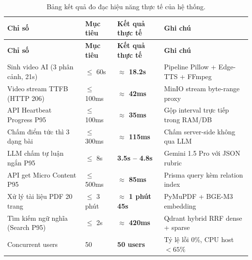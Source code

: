 \begin{longtable}{|p{4.5cm}|p{2.5cm}|p{3.2cm}|p{4.3cm}|}
    \caption{Bảng kết quả đo đạc hiệu năng thực tế của hệ thống.} \label{tab:performance-lvtn} \\
    \hline
    \textbf{Chỉ số} & \textbf{Mục tiêu} & \textbf{Kết quả thực tế} & \textbf{Ghi chú} \\
    \hline
    \endfirsthead
    \hline
    \textbf{Chỉ số} & \textbf{Mục tiêu} & \textbf{Kết quả thực tế} & \textbf{Ghi chú} \\
    \hline
    \endhead

    Sinh video AI (3 phân cảnh, 21s) & $\leq$ 60s & \textbf{$\approx$ 18.2s} & Pipeline Pillow + Edge-TTS + FFmpeg \\ \hline
    Video stream TTFB (HTTP 206) & $\leq$ 100ms & \textbf{$\approx$ 42ms} & MinIO stream byte-range proxy \\ \hline
    API Heartbeat Progress P95 & $\leq$ 100ms & \textbf{$\approx$ 35ms} & Gộp interval trực tiếp trong RAM/DB \\ \hline
    Chấm điểm tức thì 3 dạng bài & $\leq$ 300ms & \textbf{$\approx$ 115ms} & Chấm server-side không qua LLM \\ \hline
    LLM chấm tự luận ngắn P95 & $\leq$ 8s & \textbf{3.5s -- 4.8s} & Gemini 1.5 Pro với JSON rubric \\ \hline
    API get Micro Content P95 & $\leq$ 500ms & \textbf{$\approx$ 85ms} & Prisma query kèm relation index \\ \hline
    Xử lý tài liệu PDF 20 trang & $\leq$ 3 phút & \textbf{$\approx$ 1 phút 45s} & PyMuPDF + BGE-M3 embedding \\ \hline
    Tìm kiếm ngữ nghĩa (Search P95) & $\leq$ 2s & \textbf{$\approx$ 420ms} & Qdrant hybrid RRF dense + sparse \\ \hline
    Concurrent users & 50 & \textbf{50 users} & Tỷ lệ lỗi 0\%, CPU host $< 65\%$ \\ \hline
\end{longtable}
